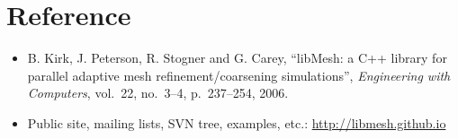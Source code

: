 \section*{Reference}
\begin{frame}[t]
  \begin{block}{}
    \begin{itemize}
    \item{
      B. Kirk, J. Peterson, R. Stogner and G. Carey, ``libMesh: a C++
      library for parallel adaptive mesh refinement/coarsening
      simulations'',  \emph{Engineering with Computers}, vol.~22, no.~3--4, p.~237--254, 2006.
      }
    \item{
      Public site, mailing lists, SVN tree, examples, etc.:
\url{http://libmesh.github.io}
      }
    \end{itemize}
  \end{block}
\end{frame}
